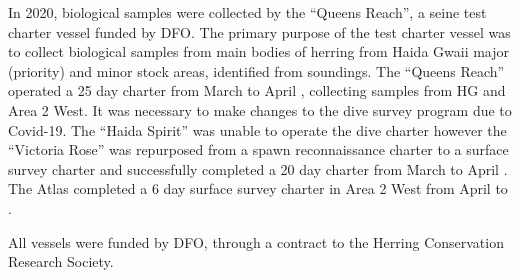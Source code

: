 In 2020, biological samples were collected by the ``Queens Reach'', a seine test charter vessel funded by DFO.
The primary purpose of the test charter vessel was to collect biological samples from main bodies of herring from Haida Gwaii major (priority) and minor stock areas, identified from soundings.
The ``Queens Reach'' operated a 25 day charter from March  to April , collecting samples from HG and Area 2 West.
It was necessary to make changes to the dive survey program due to Covid-19. The ``Haida Spirit'' was unable to operate the dive charter however the ``Victoria Rose'' was repurposed from a spawn reconnaissance charter to a surface survey charter and successfully completed a 20 day charter from March  to April .
The Atlas completed a 6 day surface survey charter in Area 2 West from April  to .

All vessels were funded by DFO, through a contract to the Herring Conservation Research Society.